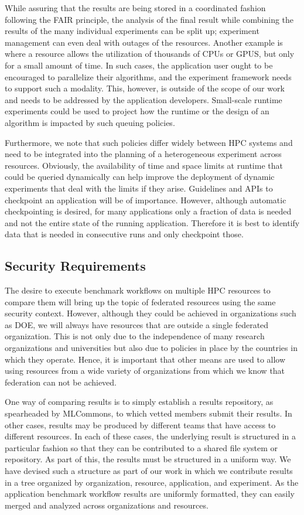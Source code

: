 \documentclass[utf8]{FrontiersinVancouver} %
\begin{document}
While assuring that the results are being stored in a coordinated fashion following the FAIR principle, the analysis of the final result while combining the results of the many individual experiments can be split up; experiment management can even deal with outages of the resources. Another example is where a resource allows the utilization of thousands of CPUs or GPUS, but only for a small amount of time. In such cases, the application user ought to be encouraged to parallelize their algorithms, and the experiment framework needs to support such a modality. This, however, is outside of the scope of our work and needs to be addressed by the application developers. Small-scale runtime experiments could be used to project how the runtime or the design of an algorithm is impacted by such queuing policies.

Furthermore, we note that such policies differ widely between HPC systems and need to be integrated into the planning of a heterogeneous experiment across resources. Obviously, the availability of time and space limits at runtime that could be queried dynamically can help improve the deployment of dynamic experiments that deal with the limits if they arise. Guidelines and APIs to checkpoint an application will be of importance. However, although automatic checkpointing is desired, for many applications only a fraction of data is needed and not the entire state of the running application. Therefore it is best to identify data that is needed in consecutive runs and only checkpoint those.


\subsection{Security Requirements}

The desire to execute benchmark workflows on multiple HPC resources to compare them will bring up the topic of federated resources using the same security context. However, although they could be achieved in organizations such as DOE, we will always have resources that are outside a single federated organization. This is not only due to the independence of many research organizations and universities but also due to policies in place by the countries in which they operate. Hence, it is important that other means are used to allow using resources from a wide variety of organizations from which we know that federation can not be achieved.

One way of comparing results is to simply establish a results repository, as spearheaded by MLCommons, to which vetted members submit their results. In other cases, results may be produced by different teams that have access to different resources. In each of these cases, the underlying result is structured in a particular fashion so that they can be contributed to a shared file system or repository. As part of this, the results must be structured in a uniform way. We have devised such a structure as part of our work in which we contribute results in a tree organized by organization, resource, application, and experiment. As the application benchmark workflow results are uniformly formatted, they can easily merged and analyzed across organizations and resources. 
\end{document}
